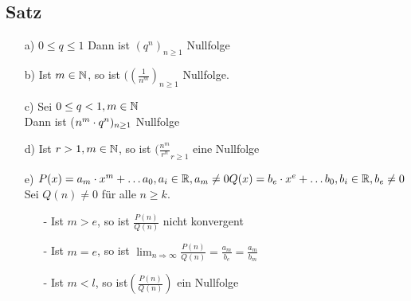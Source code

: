 \subsection{Satz}
\begin{enumerate}
\item[a)] $0 \leq q \leq 1$ Dann ist $(q^n)_{n \geq 1}$ Nullfolge
\item[b)]Ist $m \in \mathbb{N}$, so ist $((\frac{1}{n^m})_{n \geq 1}$ Nullfolge.
\item[c)]Sei $0 \leq q < 1, m \in \mathbb{N}$\\
Dann ist ($n^m \cdot q^n)_{n \geq 1}$ Nullfolge
\item[d)] Ist $r > 1, m \in \mathbb{N}$, so ist $(\frac{n^m}{r^n}_{r \geq 1}$ eine Nullfolge
\item[e)] $P(x) = a_m \cdot x^m + \ldots a_0, a_i \in \mathbb{R}, a_m \not = 0\\
Q(x) = b_e \cdot x^e + \ldots b_0 , b_i \in \mathbb{R} , b_e \not = 0$\\
Sei $Q(n) \not = 0 $ f\"ur alle $n \geq k.$\\
\begin{enumerate}
\item[-]Ist $m>e$, so ist $\frac{P(n)}{Q(n)}$ nicht konvergent
\item[-]Ist $m = e$, so ist $\lim_{n\Rightarrow \infty} \frac{P(n)}{Q(n)}= \frac{a_m}{b_e} = \frac{a_m}{b_m}$\\
\item[-]Ist $m < l$, so ist$ (\frac{P(n)}{Q(n)})$ ein Nullfolge
\end{enumerate}
\end{enumerate}
